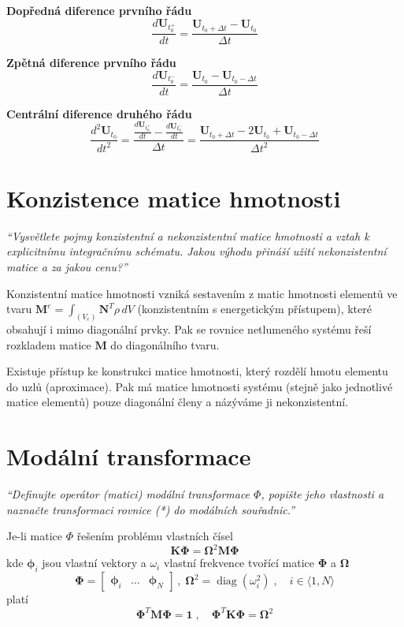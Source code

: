 \documentclass{article}
\begin{document}
	\textbf{Dopředná diference prvního řádu}
	\begin{equation}
		\frac{d\bm{U}_{t_0^+}}{dt} = \frac{\bm{U}_{t_0+\Delta t} - \bm{U}_{t_0}}{\Delta t}
	\end{equation}

	\textbf{Zpětná diference prvního řádu}
	\begin{equation}
		\frac{d\bm{U}_{t_0^-}}{dt} = \frac{\bm{U}_{t_0} - \bm{U}_{t_0-\Delta t}}{\Delta t}
	\end{equation}

	\textbf{Centrální diference druhého řádu}
	\begin{equation}
		\frac{d^2\bm{U}_{t_0}}{dt^2}
		=
		\frac{\frac{d\bm{U}_{t_0^+}}{dt} - \frac{d\bm{U}_{t_0^-}}{dt}}{\Delta t}
		=
		\frac{\bm{U}_{t_0+\Delta t} - 2\bm{U}_{t_0} + \bm{U}_{t_0-\Delta t}}{\Delta t^2}
	\end{equation}

	\section{Konzistence matice hmotnosti}
	\emph{``Vysvětlete pojmy konzistentní a nekonzistentní matice hmotnosti a vztah k explicitnímu integračnímu schématu. Jakou výhodu přináší užití nekonzistentní matice a za jakou cenu?''}

	Konzistentní matice hmotnosti vzniká sestavením z matic hmotnosti elementů ve tvaru $\bm{M}^e = \int_{(V_e)} \bm{N}^T \rho \, dV$ (konzistentním s energetickým přístupem), které obsahují i mimo diagonální prvky. Pak se rovnice netlumeného systému řeší rozkladem matice $\bm{M}$ do diagonálního tvaru.

	Existuje přístup ke konstrukci matice hmotnosti, který rozdělí hmotu elementu do uzlů (aproximace). Pak má matice hmotnosti systému (stejně jako jednotlivé matice elementů) pouze diagonální členy a názýváme ji nekonzistentní.

	\section{Modální transformace}
	\emph{``Definujte operátor (matici) modální transformace $\Phi$, popište jeho vlastnosti a naznačte transformaci rovnice (*) do modálních souřadnic.''}

	Je-li matice $\Phi$ řešením problému vlastních čísel
	\begin{equation}
		\bm{K}\bm{\Phi} = \bm{\Omega}^2 \bm{M} \bm{\Phi}
	\end{equation}
	kde $\bm{\phi}_i$ jsou vlastní vektory a $\omega_i$ vlastní frekvence tvořící matice $\bm{\Phi}$ a $\bm{\Omega}$  
	\begin{equation}
		\bm{\Phi} = \begin{bmatrix} \bm{\phi}_i & \dots & \bm{\phi}_N \end{bmatrix}
		\,,\;
		\bm{\Omega}^2 = \operatorname{diag}(\omega_i^2)
		\;,\quad 
		i \in \langle 1,N \rangle
	\end{equation}
	platí
	\begin{equation}
		\bm{\Phi}^T\bm{M}\bm{\Phi} = \bm{1}
		\;,\quad 
		\bm{\Phi}^T\bm{K}\bm{\Phi} = \bm{\Omega}^2
	\end{equation}
\end{document}
